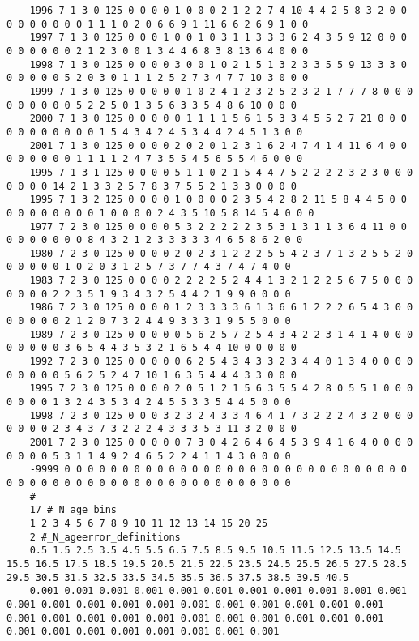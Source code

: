 \begin{landscape}
{\begin{verbatim}
	1996 7 1 3 0 125 0 0 0 0 1 0 0 0 2 1 2 2 7 4 10 4 4 2 5 8 3 2 0 0 0 0 0 0 0 0 0 1 1 1 0 2 0 6 6 9 1 11 6 6 2 6 9 1 0 0
	1997 7 1 3 0 125 0 0 0 1 0 0 1 0 3 1 1 3 3 3 6 2 4 3 5 9 12 0 0 0 0 0 0 0 0 0 2 1 2 3 0 0 1 3 4 4 6 8 3 8 13 6 4 0 0 0
	1998 7 1 3 0 125 0 0 0 0 3 0 0 1 0 2 1 5 1 3 2 3 3 5 5 9 13 3 3 0 0 0 0 0 0 5 2 0 3 0 1 1 1 2 5 2 7 3 4 7 7 10 3 0 0 0
	1999 7 1 3 0 125 0 0 0 0 0 1 0 2 4 1 2 3 2 5 2 3 2 1 7 7 7 8 0 0 0 0 0 0 0 0 0 5 2 2 5 0 1 3 5 6 3 3 5 4 8 6 10 0 0 0
	2000 7 1 3 0 125 0 0 0 0 0 1 1 1 1 5 6 1 5 3 3 4 5 5 2 7 21 0 0 0 0 0 0 0 0 0 0 0 1 5 4 3 4 2 4 5 3 4 4 2 4 5 1 3 0 0
	2001 7 1 3 0 125 0 0 0 0 2 0 2 0 1 2 3 1 6 2 4 7 4 1 4 11 6 4 0 0 0 0 0 0 0 0 1 1 1 1 2 4 7 3 5 5 4 5 6 5 5 4 6 0 0 0
	1995 7 1 3 1 125 0 0 0 0 5 1 1 0 2 1 5 4 4 7 5 2 2 2 2 3 2 3 0 0 0 0 0 0 0 14 2 1 3 3 2 5 7 8 3 7 5 5 2 1 3 3 0 0 0 0
	1995 7 1 3 2 125 0 0 0 0 1 0 0 0 0 2 3 5 4 2 8 2 11 5 8 4 4 5 0 0 0 0 0 0 0 0 0 0 1 0 0 0 0 2 4 3 5 10 5 8 14 5 4 0 0 0
	1977 7 2 3 0 125 0 0 0 0 5 3 2 2 2 2 2 3 5 3 1 3 1 1 3 6 4 11 0 0 0 0 0 0 0 0 0 8 4 3 2 1 2 3 3 3 3 3 4 6 5 8 6 2 0 0
	1980 7 2 3 0 125 0 0 0 0 2 0 2 3 1 2 2 2 5 5 4 2 3 7 1 3 2 5 5 2 0 0 0 0 0 0 1 0 2 0 3 1 2 5 7 3 7 7 4 3 7 4 7 4 0 0
	1983 7 2 3 0 125 0 0 0 0 2 2 2 2 5 2 4 4 1 3 2 1 2 2 5 6 7 5 0 0 0 0 0 0 0 2 2 3 5 1 9 3 4 3 2 5 4 4 2 1 9 9 0 0 0 0
	1986 7 2 3 0 125 0 0 0 0 1 2 3 3 3 3 6 1 3 6 6 1 2 2 2 6 5 4 3 0 0 0 0 0 0 0 2 1 2 0 7 3 2 4 4 9 3 3 3 1 9 5 5 0 0 0
	1989 7 2 3 0 125 0 0 0 0 0 5 6 2 5 7 2 5 4 3 4 2 2 3 1 4 1 4 0 0 0 0 0 0 0 0 3 6 5 4 4 3 5 3 2 1 6 5 4 4 10 0 0 0 0 0
	1992 7 2 3 0 125 0 0 0 0 0 6 2 5 4 3 4 3 3 2 3 4 4 0 1 3 4 0 0 0 0 0 0 0 0 0 5 6 2 5 2 4 7 10 1 6 3 5 4 4 4 3 3 0 0 0
	1995 7 2 3 0 125 0 0 0 0 2 0 5 1 2 1 5 6 3 5 5 4 2 8 0 5 5 1 0 0 0 0 0 0 0 1 3 2 4 3 5 3 4 2 4 5 5 3 3 5 4 4 5 0 0 0
	1998 7 2 3 0 125 0 0 0 3 2 3 2 4 3 3 4 6 4 1 7 3 2 2 2 4 3 2 0 0 0 0 0 0 0 2 3 4 3 7 3 2 2 2 4 3 3 3 5 3 11 3 2 0 0 0
	2001 7 2 3 0 125 0 0 0 0 0 7 3 0 4 2 6 4 6 4 5 3 9 4 1 6 4 0 0 0 0 0 0 0 0 5 3 1 1 4 9 2 4 6 5 2 2 4 1 1 4 3 0 0 0 0
	-9999 0 0 0 0 0 0 0 0 0 0 0 0 0 0 0 0 0 0 0 0 0 0 0 0 0 0 0 0 0 0 0 0 0 0 0 0 0 0 0 0 0 0 0 0 0 0 0 0 0 0 0 0 0 0 0 
	#
	17 #_N_age_bins
	1 2 3 4 5 6 7 8 9 10 11 12 13 14 15 20 25
	2 #_N_ageerror_definitions
	0.5 1.5 2.5 3.5 4.5 5.5 6.5 7.5 8.5 9.5 10.5 11.5 12.5 13.5 14.5 15.5 16.5 17.5 18.5 19.5 20.5 21.5 22.5 23.5 24.5 25.5 26.5 27.5 28.5 29.5 30.5 31.5 32.5 33.5 34.5 35.5 36.5 37.5 38.5 39.5 40.5
	0.001 0.001 0.001 0.001 0.001 0.001 0.001 0.001 0.001 0.001 0.001 0.001 0.001 0.001 0.001 0.001 0.001 0.001 0.001 0.001 0.001 0.001 0.001 0.001 0.001 0.001 0.001 0.001 0.001 0.001 0.001 0.001 0.001 0.001 0.001 0.001 0.001 0.001 0.001 0.001 0.001

\end{verbatim}}
\end{landscape}
